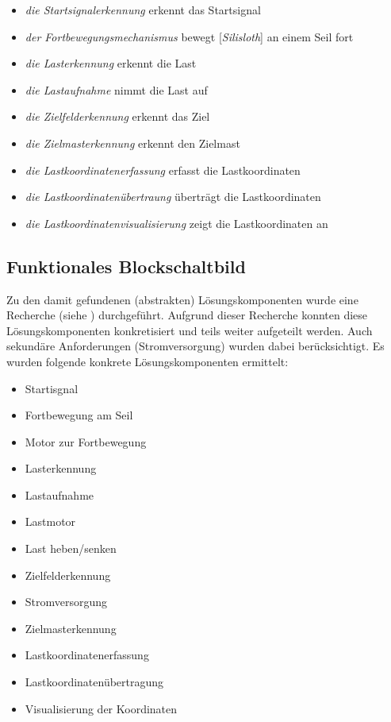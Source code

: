 \begin{multicols}{2}
\begin{itemize}[leftmargin=*]
\setlength\itemsep{0.2em}
\item \textit{die Startsignalerkennung} erkennt das Startsignal
\item \textit{der Fortbewegungsmechanismus} bewegt [\textit{Silisloth}] an einem Seil fort
\item \textit{die Lasterkennung} erkennt die Last
\item \textit{die Lastaufnahme} nimmt die Last auf
\item \textit{die Zielfelderkennung} erkennt das Ziel
\item \textit{die Zielmasterkennung} erkennt den Zielmast
\item \textit{die Lastkoordinatenerfassung} erfasst die Lastkoordinaten
\item \textit{die Lastkoordinatenübertraung} überträgt die Lastkoordinaten
\item \textit{die Lastkoordinatenvisualisierung} zeigt die Lastkoordinaten an
\end{itemize}
\end{multicols}

\subsection{Funktionales Blockschaltbild}
Zu den damit gefundenen (abstrakten) Lösungskomponenten wurde eine Recherche (siehe ) durchgeführt. Aufgrund dieser Recherche konnten diese Lösungskomponenten konkretisiert und teils weiter aufgeteilt werden. Auch sekundäre Anforderungen (Stromversorgung) wurden dabei berücksichtigt. Es wurden folgende konkrete Lösungskomponenten ermittelt:

\begin{multicols}{2}
\begin{itemize}[leftmargin=*]
\item Startisgnal
\item Fortbewegung am Seil
\item Motor zur Fortbewegung
\item Lasterkennung
\item Lastaufnahme
\item Lastmotor
\item Last heben/senken
\item Zielfelderkennung
\item Stromversorgung
\item Zielmasterkennung
\item Lastkoordinatenerfassung
\item Lastkoordinatenübertragung
\item Visualisierung der Koordinaten
\end{itemize}
\end{multicols}


